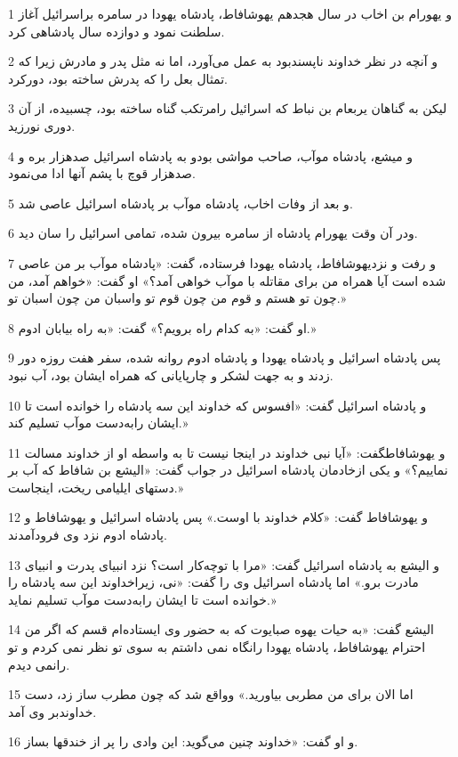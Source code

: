 \par 1 و یهورام بن اخاب در سال هجدهم یهوشافاط، پادشاه یهودا در سامره براسرائیل آغاز سلطنت نمود و دوازده سال پادشاهی کرد.
\par 2 و آنچه در نظر خداوند ناپسندبود به عمل می‌آورد، اما نه مثل پدر و مادرش زیرا که تمثال بعل را که پدرش ساخته بود، دورکرد.
\par 3 لیکن به گناهان یربعام بن نباط که اسرائیل رامرتکب گناه ساخته بود، چسبیده، از آن دوری نورزید.
\par 4 و میشع، پادشاه موآب، صاحب مواشی بودو به پادشاه اسرائیل صدهزار بره و صدهزار قوچ با پشم آنها ادا می‌نمود.
\par 5 و بعد از وفات اخاب، پادشاه موآب بر پادشاه اسرائیل عاصی شد.
\par 6 ودر آن وقت یهورام پادشاه از سامره بیرون شده، تمامی اسرائیل را سان دید.
\par 7 و رفت و نزدیهوشافاط، پادشاه یهودا فرستاده، گفت: «پادشاه موآب بر من عاصی شده است آیا همراه من برای مقاتله با موآب خواهی آمد؟» او گفت: «خواهم آمد، من چون تو هستم و قوم من چون قوم تو واسبان من چون اسبان تو.»
\par 8 او گفت: «به کدام راه برویم؟» گفت: «به راه بیابان ادوم.»
\par 9 پس پادشاه اسرائیل و پادشاه یهودا و پادشاه ادوم روانه شده، سفر هفت روزه دور زدند و به جهت لشکر و چارپایانی که همراه ایشان بود، آب نبود.
\par 10 و پادشاه اسرائیل گفت: «افسوس که خداوند این سه پادشاه را خوانده است تا ایشان رابه‌دست موآب تسلیم کند.»
\par 11 و یهوشافاطگفت: «آیا نبی خداوند در اینجا نیست تا به واسطه او از خداوند مسالت نماییم؟» و یکی ازخادمان پادشاه اسرائیل در جواب گفت: «الیشع بن شافاط که آب بر دستهای ایلیامی ریخت، اینجاست.»
\par 12 و یهوشافاط گفت: «کلام خداوند با اوست.» پس پادشاه اسرائیل و یهوشافاط و پادشاه ادوم نزد وی فرودآمدند.
\par 13 و الیشع به پادشاه اسرائیل گفت: «مرا با توچه‌کار است؟ نزد انبیای پدرت و انبیای مادرت برو.» اما پادشاه اسرائیل وی را گفت: «نی، زیراخداوند این سه پادشاه را خوانده است تا ایشان رابه‌دست موآب تسلیم نماید.»
\par 14 الیشع گفت: «به حیات یهوه صبایوت که به حضور وی ایستاده‌ام قسم که اگر من احترام یهوشافاط، پادشاه یهودا رانگاه نمی داشتم به سوی تو نظر نمی کردم و تو رانمی دیدم.
\par 15 اما الان برای من مطربی بیاورید.» وواقع شد که چون مطرب ساز زد، دست خداوندبر وی آمد.
\par 16 و او گفت: «خداوند چنین می‌گوید: این وادی را پر از خندقها بساز.
